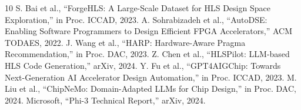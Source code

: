 \documentclass[conference]{IEEEtran}
\begin{document}

% 

\begin{thebibliography}{10}
 S. Bai et al., ``ForgeHLS: A Large-Scale Dataset for HLS Design Space Exploration,'' in Proc. ICCAD, 2023.
 A. Sohrabizadeh et al., ``AutoDSE: Enabling Software Programmers to Design Efficient FPGA Accelerators,'' ACM TODAES, 2022.
 J. Wang et al., ``HARP: Hardware-Aware Pragma Recommendation,'' in Proc. DAC, 2023.
 Z. Chen et al., ``HLSPilot: LLM-based HLS Code Generation,'' arXiv, 2024.
 Y. Fu et al., ``GPT4AIGChip: Towards Next-Generation AI Accelerator Design Automation,'' in Proc. ICCAD, 2023.
 M. Liu et al., ``ChipNeMo: Domain-Adapted LLMs for Chip Design,'' in Proc. DAC, 2024.
 Microsoft, ``Phi-3 Technical Report,'' arXiv, 2024.
\end{thebibliography}
\end{document}
